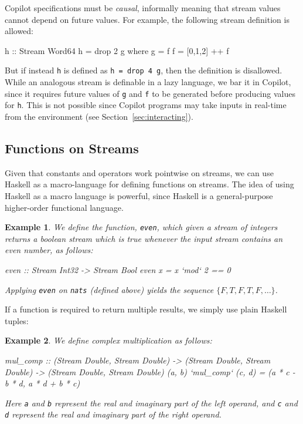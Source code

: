 \documentclass[]{article}
\theoremstyle{example}
\newtheorem{example}{Example}
\begin{document}
Copilot specifications must be \emph{causal}, informally meaning that
stream values cannot depend on future values.  For example, the following stream
definition is allowed:
%
\begin{code}
h :: Stream Word64
h = drop 2 g
  where g = f
        f = [0,1,2] ++ f
\end{code}
%

But if instead {\tt h} is defined as {\tt h = drop 4 g}, then the definition is
disallowed.  While an analogous stream is definable in a lazy language, we bar
it in Copilot, since it requires future values of {\tt g} and {\tt f} to be
generated before producing values for {\tt h}.  This is not possible since
Copilot programs may take inputs in real-time from the environment (see
Section~\ref{sec:interacting}).

\subsection{Functions on Streams}

Given that constants and operators work pointwise on streams, we can use Haskell
as a macro-language for defining functions on streams.  The idea of using
Haskell as a macro language is powerful, since Haskell is a
general-purpose higher-order functional language.

\begin{example}
We define the function, {\tt even}, which given a stream of
integers returns a boolean stream which is true whenever the input stream
contains an even number, as follows:
%
\begin{code}
even :: Stream Int32 -> Stream Bool
even x = x `mod` 2 == 0
\end{code}
%
Applying {\tt even} on {\tt nats} (defined above) yields the sequence
$\{F, T, F, T, F, \dots\}$.
\end{example}

If a function is required to return multiple results, we simply use plain
Haskell tuples:

\begin{example}
We define complex multiplication as follows:
%
\begin{code}
mul_comp
  :: (Stream Double, Stream Double)
  -> (Stream Double, Stream Double)
  -> (Stream Double, Stream Double)
(a, b) `mul_comp` (c, d) = (a * c - b * d, a * d + b * c)
\end{code}
%
Here {\tt a} and {\tt b} represent the real and imaginary part of the left
operand, and {\tt c} and {\tt d} represent the real and imaginary part
of the right operand.
\end{example}
\end{document}
